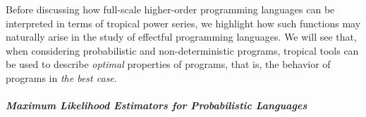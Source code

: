 
Before discussing how full-scale higher-order programming languages can be interpreted in terms of tropical power series, we highlight how such functions may naturally arise in the study of effectful programming languages.
We will see that, when considering probabilistic and non-deterministic programs, tropical tools can be used to describe \emph{optimal} properties of programs, that is, the behavior of programs in \emph{the best case}. 




\subparagraph*{Maximum Likelihood Estimators for Probabilistic Languages}

%



